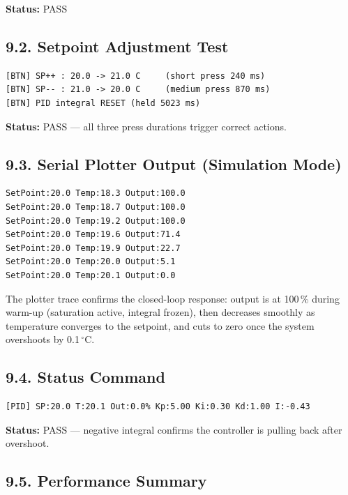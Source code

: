 \documentclass[12pt]{article}
\begin{document}
\textbf{Status:} PASS

\subsection*{9.2. Setpoint Adjustment Test}

\begin{verbatim}
[BTN] SP++ : 20.0 -> 21.0 C     (short press 240 ms)
[BTN] SP-- : 21.0 -> 20.0 C     (medium press 870 ms)
[BTN] PID integral RESET (held 5023 ms)
\end{verbatim}

\textbf{Status:} PASS --- all three press durations trigger correct actions.

\subsection*{9.3. Serial Plotter Output (Simulation Mode)}

\begin{verbatim}
SetPoint:20.0 Temp:18.3 Output:100.0
SetPoint:20.0 Temp:18.7 Output:100.0
SetPoint:20.0 Temp:19.2 Output:100.0
SetPoint:20.0 Temp:19.6 Output:71.4
SetPoint:20.0 Temp:19.9 Output:22.7
SetPoint:20.0 Temp:20.0 Output:5.1
SetPoint:20.0 Temp:20.1 Output:0.0
\end{verbatim}

The plotter trace confirms the closed-loop response: output is at 100\,\% during warm-up (saturation
active, integral frozen), then decreases smoothly as temperature converges to the setpoint, and
cuts to zero once the system overshoots by 0.1\,$^\circ$C.

\subsection*{9.4. Status Command}

\begin{verbatim}
[PID] SP:20.0 T:20.1 Out:0.0% Kp:5.00 Ki:0.30 Kd:1.00 I:-0.43
\end{verbatim}

\textbf{Status:} PASS --- negative integral confirms the controller is pulling back after overshoot.

\subsection*{9.5. Performance Summary}
\end{document}
